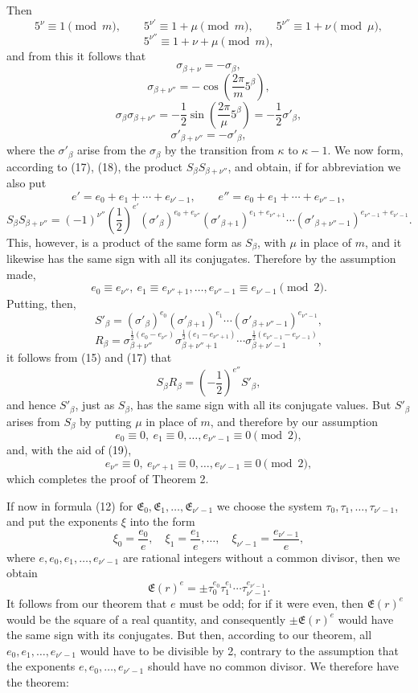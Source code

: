 \documentclass[11pt]{article}
\begin{document}
Then
\[
5^\nu\equiv1\pmod m,
\qquad 5^{\nu'}\equiv1+\mu\pmod m,
\qquad 5^{\nu''}\equiv1+\nu\pmod\mu,
\]
\[
5^{\nu''}\equiv1+\nu+\mu\pmod m,
\]
and from this it follows that
\[
\sigma_{\beta+\nu}=-\sigma_\beta,
\]
\[
\sigma_{\beta+\nu''}=-\cos\left(\frac{2\pi}{m}5^\beta\right),
\]
\begin{equation}
\sigma_\beta\sigma_{\beta+\nu''}=-\frac12\sin\left(\frac{2\pi}{\mu}5^\beta\right)=-\frac12\sigma'_\beta,
\tag{17}
\end{equation}
\begin{equation}
\sigma'_{\beta+\nu''}=-\sigma'_\beta,
\tag{18}
\end{equation}
where the $\sigma'_\beta$ arise from the $\sigma_\beta$ by the transition from $\kappa$ to $\kappa-1$. We now form, according to (17), (18), the product $S_\beta S_{\beta+\nu''}$, and obtain, if for abbreviation we also put
\[
e'=e_0+e_1+\cdots+e_{\nu'-1},
\qquad e''=e_0+e_1+\cdots+e_{\nu''-1},
\]
\[
S_\beta S_{\beta+\nu''}=(-1)^{\nu''}\left(\frac12\right)^{e'}
(\sigma'_\beta)^{e_0+e_{\nu''}}(\sigma'_{\beta+1})^{e_1+e_{\nu''+1}}\cdots
(\sigma'_{\beta+\nu''-1})^{e_{\nu''-1}+e_{\nu'-1}}.
\]
This, however, is a product of the same form as $S_\beta$, with $\mu$ in place of $m$, and it likewise has the same sign with all its conjugates. Therefore by the assumption made,
\begin{equation}
e_0\equiv e_{\nu''},\ e_1\equiv e_{\nu''+1},\ldots,e_{\nu''-1}\equiv e_{\nu'-1}\pmod2.
\tag{19}
\end{equation}
Putting, then,
\[
S'_\beta=(\sigma'_\beta)^{e_0}(\sigma'_{\beta+1})^{e_1}\cdots(\sigma'_{\beta+\nu''-1})^{e_{\nu''-1}},
\]
\[
R_\beta=\sigma_{\beta+\nu''}^{\frac12(e_0-e_{\nu''})}
\sigma_{\beta+\nu''+1}^{\frac12(e_1-e_{\nu''+1})}\cdots
\sigma_{\beta+\nu'-1}^{\frac12(e_{\nu''-1}-e_{\nu'-1})},
\]
it follows from (15) and (17) that
\[
S_\beta R_\beta=\left(-\frac12\right)^{e''}S'_\beta,
\]
and hence $S'_\beta$, just as $S_\beta$, has the same sign with all its conjugate values. But $S'_\beta$ arises from $S_\beta$ by putting $\mu$ in place of $m$, and therefore by our assumption
\[
e_0\equiv0,\ e_1\equiv0,\ldots,e_{\nu''-1}\equiv0\pmod2,
\]
and, with the aid of (19),
\[
e_{\nu''}\equiv0,\ e_{\nu''+1}\equiv0,\ldots,e_{\nu'-1}\equiv0\pmod2,
\]
which completes the proof of Theorem 2.

If now in formula (12) for $\mathfrak E_0,\mathfrak E_1,\ldots,\mathfrak E_{\nu'-1}$ we choose the system $\tau_0,\tau_1,\ldots,\tau_{\nu'-1}$, and put the exponents $\xi$ into the form
\[
\xi_0=\frac{e_0}{e},\quad \xi_1=\frac{e_1}{e},\ldots,\quad \xi_{\nu'-1}=\frac{e_{\nu'-1}}{e},
\]
where $e,e_0,e_1,\ldots,e_{\nu'-1}$ are rational integers without a common divisor, then we obtain
\[
\mathfrak E(r)^e=\pm\tau_0^{e_0}\tau_1^{e_1}\cdots\tau_{\nu'-1}^{e_{\nu'-1}}.
\]
It follows from our theorem that $e$ must be odd; for if it were even, then $\mathfrak E(r)^e$ would be the square of a real quantity, and consequently $\pm\mathfrak E(r)^e$ would have the same sign with its conjugates. But then, according to our theorem, all $e_0,e_1,\ldots,e_{\nu'-1}$ would have to be divisible by 2, contrary to the assumption that the exponents $e,e_0,
\ldots,e_{\nu'-1}$ should have no common divisor. We therefore have the theorem:
\end{document}
